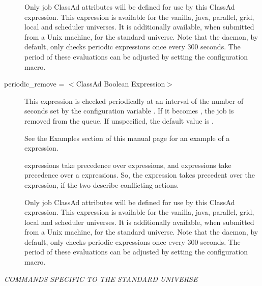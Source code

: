 \begin{description}
Only job ClassAd attributes will be defined for use by this ClassAd expression.
This expression is available for the vanilla, java, parallel, grid,
local and scheduler universes.
It is additionally available, when submitted from a Unix machine,
for the standard universe.  Note that the  daemon,
by default, only checks
periodic expressions once every 300 seconds.  The period of
these evaluations can be adjusted by setting the
 configuration macro.


\label{condor-submit-periodic-remove}
\item[periodic\_remove = $<$ClassAd Boolean Expression$>$]
This expression is checked periodically at an interval of
the number of seconds set by
the configuration variable .
If it becomes , the job is removed from the queue.
If unspecified, the default value is .

See the Examples section of this manual page
for an example of a  expression.

 expressions take
precedence over  expressions,
and  expressions take
precedence over a  expressions.
So, the  expression takes precedent over
the  expression,
if the two describe conflicting actions.

Only job ClassAd attributes will be defined for use by this ClassAd expression.
This expression is available for the vanilla, java, parallel, grid,
local and scheduler universes.
It is additionally available, when submitted from a Unix machine,
for the standard universe.  Note that the  daemon,
by default, only checks
periodic expressions once every 300 seconds.  The period of
these evaluations can be adjusted by setting the
 configuration macro.

\end{description} 



\emph{COMMANDS SPECIFIC TO THE STANDARD UNIVERSE}

